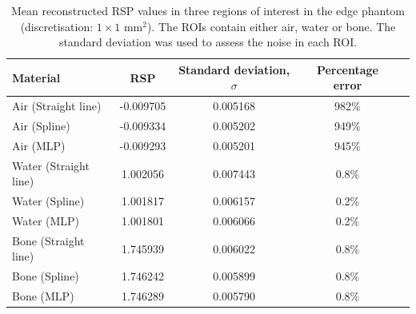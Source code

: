 \documentclass[11pt,a4paper]{article}
\begin{document}
%

\begin{table}[!htb]
\centering
\caption{Mean reconstructed RSP values in three regions of interest in the edge phantom (discretisation: $1 \times 1$ mm$^2$). The ROIs contain either air, water or bone. The standard deviation was used to assess the noise in each ROI.}
\begin{tabular}{l|cccc}
\hline
Material & RSP & Standard deviation, $\sigma$ & Percentage error\\ \hline
Air (Straight line) & -0.009705 & 0.005168 & 982\% \\
Air (Spline) & -0.009334 & 0.005202 & 949\%\\
Air (MLP) & -0.009293 & 0.005201 &  945\% \\
Water (Straight line) & 1.002056 & 0.007443 & 0.8\% \\
Water (Spline) & 1.001817 & 0.006157 & 0.2\% \\ 
Water (MLP) & 1.001801 & 0.006066  & 0.2\%\\
Bone (Straight line) & 1.745939 & 0.006022 & 0.8\%\\ 
Bone (Spline) & 1.746242 & 0.005899 & 0.8\%\\ 
Bone (MLP) & 1.746289 & 0.005790 & 0.8\%\\ 
\end{tabular} 

\label{table:edgeVals}
\end{table}
\end{document}
